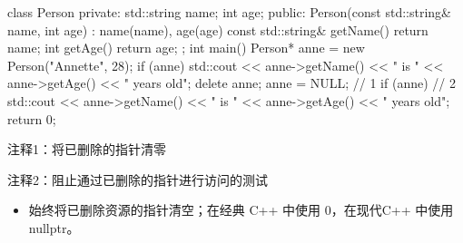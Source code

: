 \begin{cpp}
class Person {
private:
  std::string name;
  int age;
public:
  Person(const std::string& name, int age) : name(name), age(age) {}
  const std::string& getName() { return name; }
  int getAge() { return age; }
};
int main() {
  Person* anne = new Person("Annette", 28);
  if (anne)
    std::cout << anne->getName() << " is " << anne->getAge() << " years old\n";
  delete anne;
  anne = NULL; // 1
  if (anne) // 2
    std::cout << anne->getName() << " is " << anne->getAge() << " years old\n";
  return 0;
}
\end{cpp}

{\footnotesize
注释1：将已删除的指针清零

注释2：阻止通过已删除的指针进行访问的测试
}


\begin{itemize}
\item
始终将已删除资源的指针清空；在经典 C++ 中使用 0，在现代C++ 中使用 nullptr。
\end{itemize}










